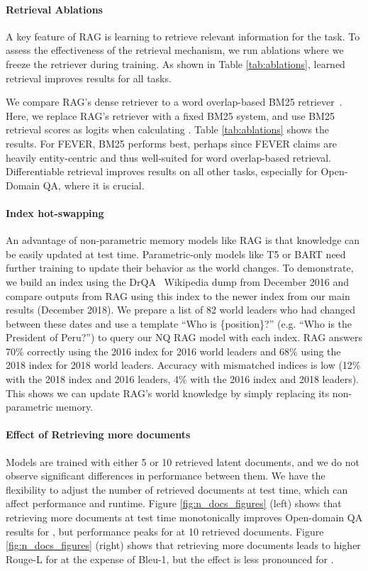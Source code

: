 \documentclass{article}
\begin{document}
\paragraph{Retrieval Ablations} A key feature of RAG is learning to retrieve relevant information for the task.
To assess the effectiveness of the retrieval mechanism, we run ablations where we freeze the retriever during training.
As shown in Table \ref{tab:ablations}, learned retrieval improves results for all tasks.

We compare RAG's dense retriever to a word overlap-based BM25 retriever~\cite{robertson2009bm25}. Here, we replace RAG's retriever with a fixed BM25 system, and use BM25 retrieval scores as logits when calculating . Table \ref{tab:ablations}
shows the results.
For FEVER, BM25 performs best, perhaps since FEVER claims are heavily entity-centric and thus well-suited for word overlap-based retrieval.
Differentiable retrieval improves results on all other tasks, especially for Open-Domain QA, where it is crucial.


\paragraph{Index hot-swapping}An advantage of non-parametric memory models like RAG is that knowledge can be easily updated at test time. Parametric-only models like T5 or BART need further training to update their behavior as the world changes. To demonstrate, we build an index using the DrQA~\cite{chen_reading_2017} Wikipedia dump from December 
2016 and compare outputs from RAG using this index to the newer index from our main results (December 
2018). We prepare a list of 82 world leaders who had changed between these dates and use a template ``Who is \{position\}?'' (e.g. ``Who is the President of Peru?'') to query our NQ RAG model with each index.
RAG answers 70\% correctly using the 2016 index for 2016 world leaders and 68\% using the 2018 index for  2018 world leaders. 
Accuracy with mismatched indices is low 
(12\% with the 2018 index and 2016 leaders, 4\% with the 2016 index and 2018 leaders). 
This shows we can update RAG's world knowledge by simply replacing its 
non-parametric memory.

\paragraph{Effect of Retrieving more documents} 
Models are trained with either 5 or 10 retrieved latent documents, and we do not observe significant differences in performance between them. 
We have the flexibility to adjust the number of retrieved documents at test time, 
which can affect performance and runtime.
Figure \ref{fig:n_docs_figures} (left) shows that retrieving more documents at test time monotonically improves Open-domain QA results for \raganswer{}, but performance peaks for \ragtoken{} at 10 retrieved documents. Figure \ref{fig:n_docs_figures} (right) shows that retrieving more documents leads to higher Rouge-L for \ragtoken{} at the expense of Bleu-1, but the effect is less pronounced for \raganswer{}. 
\end{document}
